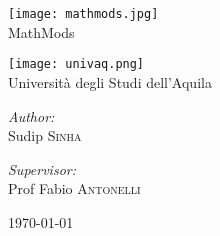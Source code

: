 \begin{titlepage}
  \begin{center}

    \begin{minipage}[c]{0.45\textwidth}
      \begin{center}
        \texttt{[image: mathmods.jpg]} \\
        \LARGE{MathMods}
      \end{center}
    \end{minipage}
    \begin{minipage}[c]{0.45\textwidth}
      \begin{center}
        \texttt{[image: univaq.png]} \\
        \Large{Università degli Studi dell'Aquila}
      \end{center}
    \end{minipage}

    

    \vfill

    \noindent
    \begin{minipage}[t]{0.4\textwidth}
      \begin{flushleft} \large
        \emph{Author:}\\
        Sudip \textsc{Sinha}
      \end{flushleft}
    \end{minipage}
    \begin{minipage}[t]{0.4\textwidth}
      \begin{flushright} \large
        \emph{Supervisor:} \\
        Prof Fabio \textsc{Antonelli}
      \end{flushright}
    \end{minipage}

    \vfill

    {\large \today}

  \end{center}
\end{titlepage}

